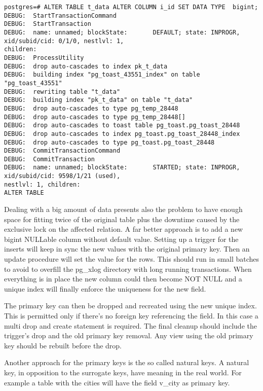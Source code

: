 \begin{lstlisting}[style=pgsql]
postgres=# ALTER TABLE t_data ALTER COLUMN i_id SET DATA TYPE  bigint; 
DEBUG:  StartTransactionCommand
DEBUG:  StartTransaction
DEBUG:  name: unnamed; blockState:       DEFAULT; state: INPROGR, xid/subid/cid: 0/1/0, nestlvl: 1, 
children: 
DEBUG:  ProcessUtility
DEBUG:  drop auto-cascades to index pk_t_data
DEBUG:  building index "pg_toast_43551_index" on table "pg_toast_43551"
DEBUG:  rewriting table "t_data"
DEBUG:  building index "pk_t_data" on table "t_data"
DEBUG:  drop auto-cascades to type pg_temp_28448
DEBUG:  drop auto-cascades to type pg_temp_28448[]
DEBUG:  drop auto-cascades to toast table pg_toast.pg_toast_28448
DEBUG:  drop auto-cascades to index pg_toast.pg_toast_28448_index
DEBUG:  drop auto-cascades to type pg_toast.pg_toast_28448
DEBUG:  CommitTransactionCommand
DEBUG:  CommitTransaction
DEBUG:  name: unnamed; blockState:       STARTED; state: INPROGR, xid/subid/cid: 9598/1/21 (used), 
nestlvl: 1, children: 
ALTER TABLE

\end{lstlisting}


Dealing with a big amount of data presents also the problem to have enough space for fitting twice 
of the original table plus the downtime caused by the exclusive lock on the affected relation. A 
far better approach is to add a new bigint NULLable column without default value. Setting up a 
trigger for the inserts will keep in sync the new values with the original primary key. Then an 
update procedure will set the value for the rows. This should run in small batches to avoid to 
overfill the pg\_xlog directory with long running transactions. When everything is in place the new 
column could then become NOT NULL and a unique index will finally enforce the uniqueness for the 
new 
field. \newline

The primary key can then be dropped and recreated using the new unique index. This is permitted 
only if there's no foreign key referencing the field. In this case a multi drop and create 
statement is required. The final cleanup should include the trigger's drop and the old primary key 
removal. Any view using the old primary key should be rebuilt before the drop.\newline

Another approach for the primary keys is the so called natural keys. A natural key, in opposition 
to the surrogate keys, have meaning in the real world. For example a table with the cities will 
have the field v\_city as primary key. 

